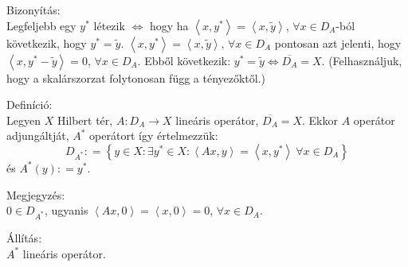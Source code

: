 \documentclass[12pt,a4paper]{scrartcl}
\newenvironment{definicio}{}{}
\newenvironment{bizonyitas}{}{}
\newenvironment{allitas}{}{}
\newenvironment{megjegyzes}{}{}
\begin{document}
\begin{bizonyitas}

Bizonyítás:\\
Legfeljebb egy \(y^{*}\) létezik \(\Leftrightarrow\) hogy ha
\(\left\langle {x,y^{*}} \right\rangle = \left\langle {x,\widetilde{y}} \right\rangle\),
\(\forall x \in D_{A}\)-ból következik, hogy \(y^{*} = \widetilde{y}\).
\(\left\langle {x,y^{*}} \right\rangle = \left\langle {x,\widetilde{y}} \right\rangle\),
\(\forall x \in D_{A}\) pontosan azt jelenti, hogy
\(\left\langle {x,y^{*} - \widetilde{y}} \right\rangle = 0\),
\(\forall x \in D_{A}\). Ebből következik:
\(\left. y^{*} = \widetilde{y}\Leftrightarrow\overline{D_{A}} = X \right.\).
(Felhasználjuk, hogy a skalárszorzat folytonosan függ a tényezőktől.)

\end{bizonyitas}

\begin{definicio}

Definíció:\\
Legyen \(X\) Hilbert tér, \(\left. A:D_{A}\rightarrow X \right.\)
lineáris operátor, \(\overline{D_{A}} = X\). Ekkor \(A\) operátor
adjungáltját, \(A^{*}\) operátort így értelmezzük:
\[D_{A^{*}}: = \left\{ {y \in X:\exists y^{*} \in X:\left\langle {Ax,y} \right\rangle = \left\langle {x,y^{*}} \right\rangle\ \forall x \in D_{A}} \right\}\]
és \(A^{*}\left( y \right): = y^{*}\).

\end{definicio}

\begin{megjegyzes}

Megjegyzés:\\
\(0 \in D_{A^{*}}\), ugyanis
\(\left\langle {Ax,0} \right\rangle = \left\langle {x,0} \right\rangle = 0\),
\(\forall x \in D_{A}\).

\end{megjegyzes}

\begin{allitas}

Állítás:\\
\(A^{*}\) lineáris operátor.

\end{allitas}
\end{document}
